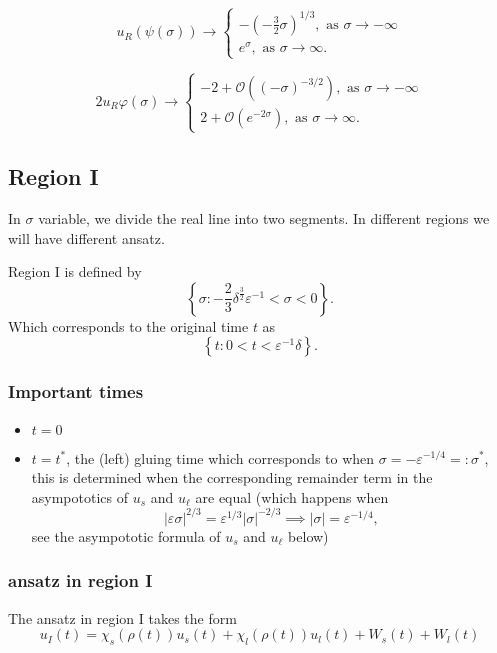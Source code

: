 \documentclass[letterpaper,11pt]{article}
\newcommand{\rmO}{\mathcal{O}}
\newcommand{\eps}{\varepsilon}
\numberwithin{equation}{section}
\theoremstyle{plain}
\begin{document}
\begin{equation*}
u_R(\psi(\sigma)) \to \begin{cases}
 -(-\frac{3}{2}\sigma)^{1/3}, \text{ as }\sigma \to -\infty\\
e^{\sigma} , \text{ as }\sigma \to \infty.
\end{cases}
\end{equation*}

\begin{equation*}
2u_R\varphi(\sigma) \to\begin{cases}
-2+ \rmO((-\sigma)^{-3/2}), \text{ as }\sigma \to -\infty\\
2+ \rmO(e^{-2\sigma}), \text{ as }\sigma \to \infty.
\end{cases}
\end{equation*}
%
\fi
\subsection{Region I}
In $\sigma$ variable, we divide the real line into two segments. In different regions we will have different ansatz.

Region I is defined by 
\[
\left\{ \sigma : -\frac{2}{3}\delta^{\frac{3}{2}}\eps^{-1}<\sigma<0 \right\}.
\] 
Which corresponds to the original time $t$ as 
\[
\left\{ t : 0<t< \eps^{-1}\delta \right\}.
\]
\subsubsection{Important times}
\begin{itemize}
\item $t= 0$
\item $t = t^*$, the (left) gluing time which corresponds to when $\sigma = -\eps^{-1/4}=:\sigma^*$, this is determined when the corresponding remainder term in the asympototics of $u_s$ and $u_\ell$ are equal
(which happens when \[ |\eps \sigma|^{2/3} = \eps^{1/3}|\sigma|^{-2/3}\implies |\sigma| = \eps^{-1/4},\]see the asympototic formula of $u_s$ and $u_\ell$ below)

\end{itemize}

\subsubsection{ansatz in region I}
The ansatz in region I takes the form
\[
u_I(t) = \chi_s(\rho(t))u_s(t) + \chi_l(\rho(t))u_l(t) + W_s(t)+W_l(t)
\]
\end{document}
